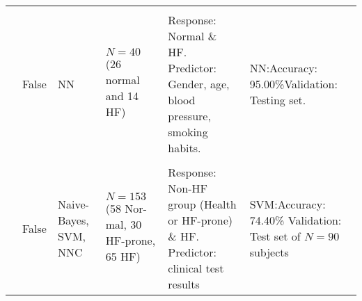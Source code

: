 \begin{footnotesize}
\begin{tabularx}{\textwidth}{Lp{1cm}LLLp{3cm}}
&\\
\cite{gharehchopogh2011neural} & False & NN & $N = 40$ (26 normal and 14 HF) & Response: Normal \& HF. Predictor: Gender, age, blood pressure, smoking habits. & NN:\newline Accuracy: 95.00\%\newline \newline Validation: Testing set.\\
&\\
\cite{yang2010heart} & False & Naive-Bayes, SVM, NNC & $N=153$ (58 Nor- mal, 30 HF-prone, 65 HF) & Response: Non-HF group (Health or HF-prone) \& HF. Predictor: clinical test results & SVM:\newline Accuracy: 74.40\% \newline \newline Validation: Test set of $N=90$ subjects\\[-0,05cm]
\midrule
\end{tabularx}
\end{footnotesize}